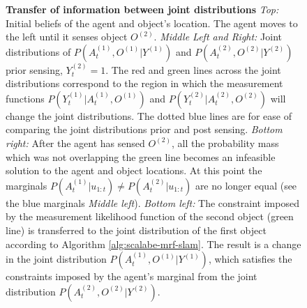 \begin{figure}
  \centering
  \caption{\textbf{Transfer of information between joint distributions} 
  \textit{Top:} Initial beliefs of the agent and object's location. The agent moves to the left until it senses object $O^{(2)}$.
  \textit{Middle Left and Right:} Joint distributions of 
   $P(A^{(1)}_t,O^{(1)}|Y^{(1)})$ and $P(A^{(2)}_t,O^{(2)}|Y^{(2)})$ prior sensing, $Y_t^{(2)}=1$. The red and green lines across the joint distributions 
   correspond to the region in which the measurement functions $P(Y^{(1)}_{t}|A^{(1)}_t,O^{(1)})$ and $P(Y^{(2)}_{t}|A^{(2)}_t,O^{(2)})$ will change the joint distributions.
  The dotted blue lines are for ease of comparing the joint distributions prior and post sensing.
  \textit{Bottom right:}  After the agent has sensed $O^{(2)}$, all the probability mass which was not overlapping the green line becomes an infeasible
  solution to the agent and object locations. At this point the marginals $P(A^{(1)}_t|u_{1:t}) \not= P(A^{(2)}_t|u_{1:t})$ are no longer equal 
  (see the blue marginals \textit{Middle left}). \textit{Bottom left:} The constraint imposed by the measurement likelihood function of the second object
  (green line) is transferred to the joint distribution of the first object according to Algorithm \ref{alg:scalabe-mrf-slam}.
  The result is a change in the joint distribution  $P(A^{(1)}_t,O^{(1)}|Y^{(1)})$, which satisfies the constraints 
  imposed by the agent's marginal from the joint distribution $P(A^{(2)}_t,O^{(2)}|Y^{(2)})$.}
  \label{fig:transfer_information}
\end{figure}


